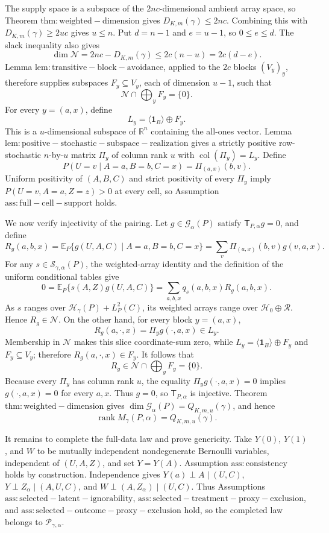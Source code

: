 The supply space is a subspace of the \(2nc\)-dimensional ambient array space, so Theorem \(\mathrm{thm:weighted-dimension}\) gives \(D_{K,m}(\gamma)\le2nc\). Combining this with \(D_{K,m}(\gamma)\ge2uc\) gives \(u\le n\). Put \(d=n-1\) and \(e=u-1\), so \(0\le e\le d\). The slack inequality also gives
\[\dim\mathcal N=2nc-D_{K,m}(\gamma)\le2c(n-u)=2c(d-e).\]
Lemma \(\mathrm{lem:transitive-block-avoidance}\), applied to the \(2c\) blocks \((V_y)_y\), therefore supplies subspaces \(F_y\subseteq V_y\), each of dimension \(u-1\), such that
\[\mathcal N\cap\bigoplus_yF_y=\{0\}.\]
For every \(y=(a,x)\), define
\[L_y=\langle\mathbf1_B\rangle\oplus F_y.\]
This is a \(u\)-dimensional subspace of \(\mathbb R^n\) containing the all-ones vector. Lemma \(\mathrm{lem:positive-stochastic-subspace-realization}\) gives a strictly positive row-stochastic \(n\)-by-\(u\) matrix \(\Pi_y\) of column rank \(u\) with \(\operatorname{col}(\Pi_y)=L_y\). Define
\[P(U=v\mid A=a,B=b,C=x)=\Pi_{(a,x)}(b,v).\]
Uniform positivity of \((A,B,C)\) and strict positivity of every \(\Pi_y\) imply \(P(U=v,A=a,Z=z)>0\) at every cell, so Assumption \(\mathrm{ass:full-cell-support}\) holds.

We now verify injectivity of the pairing. Let \(g\in\mathcal G_\alpha(P)\) satisfy \(\mathsf T_{P,\alpha}g=0\), and define
\[R_g(a,b,x)=\mathbb E_P\{g(U,A,C)\mid A=a,B=b,C=x\}=\sum_v\Pi_{(a,x)}(b,v)g(v,a,x).\]
For any \(s\in\mathcal S_{\gamma,\alpha}(P)\), the weighted-array identity and the definition of the uniform conditional tables give
\[0=\mathbb E_P\{s(A,Z)g(U,A,C)\}=\sum_{a,b,x}q_s(a,b,x)R_g(a,b,x).\]
As \(s\) ranges over \(\mathcal H_\gamma(P)+L_P^2(C)\), its weighted arrays range over \(\mathcal H_0\oplus\mathcal R\). Hence \(R_g\in\mathcal N\). On the other hand, for every block \(y=(a,x)\),
\[R_g(a,\cdot,x)=\Pi_y g(\cdot,a,x)\in L_y.\]
Membership in \(\mathcal N\) makes this slice coordinate-sum zero, while \(L_y=\langle\mathbf1_B\rangle\oplus F_y\) and \(F_y\subseteq V_y\); therefore \(R_g(a,\cdot,x)\in F_y\). It follows that
\[R_g\in\mathcal N\cap\bigoplus_yF_y=\{0\}.\]
Because every \(\Pi_y\) has column rank \(u\), the equality \(\Pi_y g(\cdot,a,x)=0\) implies \(g(\cdot,a,x)=0\) for every \(a,x\). Thus \(g=0\), so \(\mathsf T_{P,\alpha}\) is injective. Theorem \(\mathrm{thm:weighted-dimension}\) gives \(\dim\mathcal G_\alpha(P)=Q_{K,m,u}(\gamma)\), and hence
\[\operatorname{rank}M_\gamma(P,\alpha)=Q_{K,m,u}(\gamma).\]

It remains to complete the full-data law and prove genericity. Take \(Y(0)\), \(Y(1)\), and \(W\) to be mutually independent nondegenerate Bernoulli variables, independent of \((U,A,Z)\), and set \(Y=Y(A)\). Assumption \(\mathrm{ass:consistency}\) holds by construction. Independence gives \(Y(a)\perp A\mid(U,C)\), \(Y\perp Z_\alpha\mid(A,U,C)\), and \(W\perp(A,Z_\alpha)\mid(U,C)\). Thus Assumptions \(\mathrm{ass:selected-latent-ignorability}\), \(\mathrm{ass:selected-treatment-proxy-exclusion}\), and \(\mathrm{ass:selected-outcome-proxy-exclusion}\) hold, so the completed law belongs to \(\mathcal P_{\gamma,\alpha}\).

